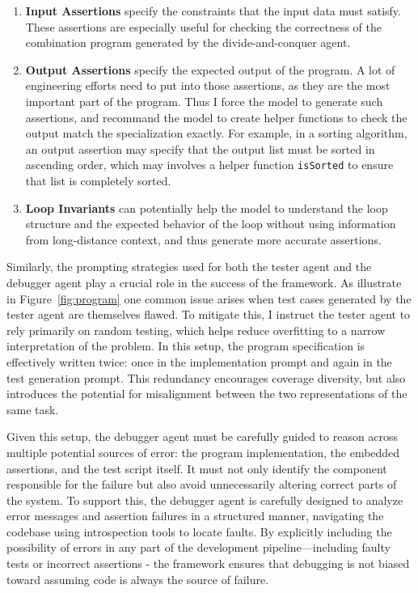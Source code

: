 \begin{enumerate}
    \item \textbf{Input Assertions} specify the constraints that the input data must satisfy. These assertions are especially useful for checking the correctness of the combination program generated by the divide-and-conquer agent.
    \item \textbf{Output Assertions} specify the expected output of the program. A lot of engineering efforts need to put into those assertions, as they are the most important part of the program. Thus I force the model to generate such assertions, and recommand the model to create helper functions to check the output match the specialization exactly. For example, in a sorting algorithm, an output assertion may specify that the output list must be sorted in ascending order, which may involves a helper function \texttt{isSorted} to ensure that list is completely sorted.
    \item \textbf{Loop Invariants} can potentially help the model to understand the loop structure and the expected behavior of the loop without using information from long-distance context, and thus generate more accurate assertions. 
\end{enumerate}

Similarly, the prompting strategies used for both the tester agent and the debugger agent play a crucial role in the success of the framework. As illustrate in Figure~\ref{fig:program} one common issue arises when test cases generated by the tester agent are themselves flawed. To mitigate this, I instruct the tester agent to rely primarily on random testing, which helps reduce overfitting to a narrow interpretation of the problem. In this setup, the program specification is effectively written twice: once in the implementation prompt and again in the test generation prompt. This redundancy encourages coverage diversity, but also introduces the potential for misalignment between the two representations of the same task.

Given this setup, the debugger agent must be carefully guided to reason across multiple potential sources of error: the program implementation, the embedded assertions, and the test script itself. It must not only identify the component responsible for the failure but also avoid unnecessarily altering correct parts of the system. To support this, the debugger agent is carefully designed to analyze error messages and assertion failures in a structured manner, navigating the codebase using introspection tools to locate faults. By explicitly including the possibility of errors in any part of the development pipeline—including faulty tests or incorrect assertions - the framework ensures that debugging is not biased toward assuming code is always the source of failure.



